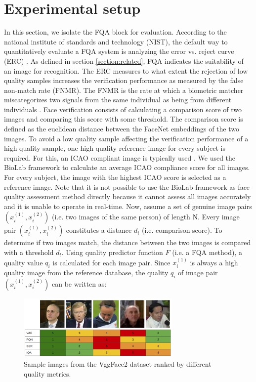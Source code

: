 \documentclass[letterpaper]{article} %
\begin{document}
\section{Experimental setup}
\label{section:experimental_setup}
In this section, we isolate the FQA block for evaluation. According to the national institute of standards and technology (NIST), the default way to quantitatively evaluate a FQA system is analyzing the error vs. reject curve (ERC) \cite{grother2007performance, grother2020ongoing}. As defined in section \ref{section:related}, FQA indicates the suitability of an image for recognition. The ERC measures to what extent the rejection of low quality samples increases the verification performance as measured by the false non-match rate (FNMR). The FNMR is the rate at which a biometric matcher miscategorizes two signals from the same individual as being from different individuals \cite{Schuckers2010}. Face verification consists of calculating a comparison score of two images and comparing this score with some threshold. The comparison score is defined as the euclidean distance between the FaceNet \cite{schroff2015facenet} embeddings of the two images. To avoid a low quality sample affecting the verification performance of a high quality sample, one high quality reference image for every subject is required. For this, an ICAO compliant image is typically used \cite{hernandez2020biometric}. We used the BioLab framework \cite{ferrara2012face} to calculate an average ICAO compliance score for all images. For every subject,  the image with the highest ICAO score is selected as a reference image. Note that it is not possible to use the BioLab framework as face quality assessment method directly because it cannot assess all images accurately and it is unable to operate in real-time. Now, assume a set of genuine image pairs $(x_i^{(1)}, x_i^{(2)})$ (i.e. two images of the same person) of length N. Every image pair $(x_i^{(1)}, x_i^{(2)})$ constitutes a distance $d_i$ (i.e. comparison score). To determine if two images match, the distance between the two images is compared with a threshold $d_t$. Using quality predictor function $F$ (i.e. a FQA method), a quality value $q_i$ is calculated for each image pair. Since $x_i^{(1)}$ is always a high quality image from the reference database, the quality $q_i$ of image pair $(x_i^{(1)}, x_i^{(2)})$ can be written as:
\begin{figure}[t]
\centering
\includegraphics[width=225pt]{figures/example.png}
\caption{Sample images from the VggFace2 dataset ranked by different quality metrics.}
\label{fig:example_images}
\end{figure}
\end{document}
